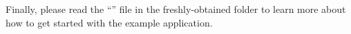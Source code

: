 Finally, please read the ``'' file in the freshly-obtained
 folder to learn more about how to get started with the
example application.






